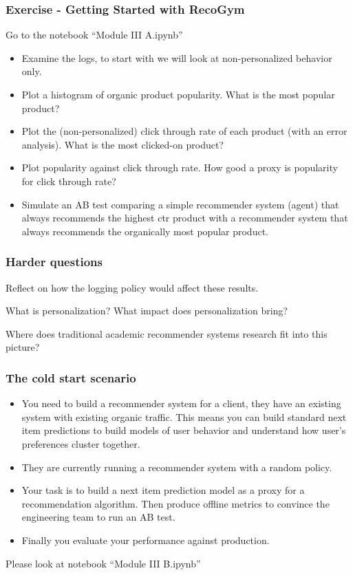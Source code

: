   \begin{frame}
    \frametitle{Exercise - Getting Started with RecoGym}

    Go to the notebook ``Module III A.ipynb''
\begin{itemize}
  \item Examine the logs, to start with we will look at non-personalized behavior only.
  \item Plot a histogram of organic product popularity. What is the most popular product?  
  \item Plot the (non-personalized) click through rate of each product (with an error analysis).  What is the most clicked-on product?
  \item Plot popularity against click through rate.  How good a proxy is popularity for click through rate?
  \item Simulate an AB test comparing a simple recommender system (agent) that always recommends the highest ctr product with a recommender system that always recommends the organically most popular product.
\end{itemize}
\end{frame}

\begin{frame}
  \frametitle{Harder questions}

Reflect on how the logging policy would affect these results.

\pause

What is personalization? What impact does personalization bring?

\pause

Where does traditional academic recommender systems research fit into this picture?  

\end{frame}


\begin{frame}
  \frametitle{The cold start scenario}

    \begin{itemize}
      \item You need to build a recommender system for a client, they have an existing system with existing organic traffic.  \pause This means you can build standard next item predictions to build models of user behavior and understand how user's preferences cluster together. \pause
      \item They are currently running a recommender system with a random policy. \pause
      \item Your task is to build a next item prediction model as a proxy for a recommendation algorithm.  Then produce offline metrics to convince the engineering team to run an AB test.\pause
      \item Finally you evaluate your performance against production.
    \end{itemize}

    \pause
    Please look at notebook ``Module III B.ipynb''

\end{frame}



